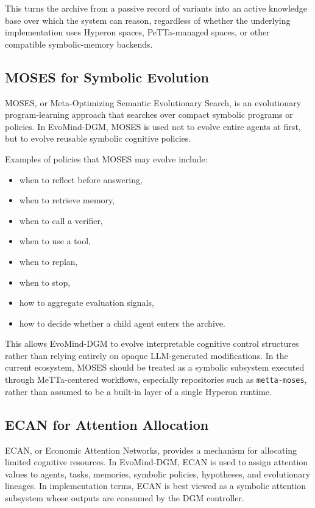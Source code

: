 \documentclass[11pt]{article}
\begin{document}
This turns the archive from a passive record of variants into an active knowledge base over which the system can reason, regardless of whether the underlying implementation uses Hyperon spaces, PeTTa-managed spaces, or other compatible symbolic-memory backends.

\subsection{MOSES for Symbolic Evolution}

MOSES, or Meta-Optimizing Semantic Evolutionary Search, is an evolutionary program-learning approach that searches over compact symbolic programs or policies. In EvoMind-DGM, MOSES is used not to evolve entire agents at first, but to evolve reusable symbolic cognitive policies.

Examples of policies that MOSES may evolve include:

\begin{itemize}[leftmargin=*]
    \item when to reflect before answering,
    \item when to retrieve memory,
    \item when to call a verifier,
    \item when to use a tool,
    \item when to replan,
    \item when to stop,
    \item how to aggregate evaluation signals,
    \item how to decide whether a child agent enters the archive.
\end{itemize}

This allows EvoMind-DGM to evolve interpretable cognitive control structures rather than relying entirely on opaque LLM-generated modifications. In the current ecosystem, MOSES should be treated as a symbolic subsystem executed through MeTTa-centered workflows, especially repositories such as \texttt{metta-moses}, rather than assumed to be a built-in layer of a single Hyperon runtime.

\subsection{ECAN for Attention Allocation}

ECAN, or Economic Attention Networks, provides a mechanism for allocating limited cognitive resources. In EvoMind-DGM, ECAN is used to assign attention values to agents, tasks, memories, symbolic policies, hypotheses, and evolutionary lineages. In implementation terms, ECAN is best viewed as a symbolic attention subsystem whose outputs are consumed by the DGM controller.
\end{document}
